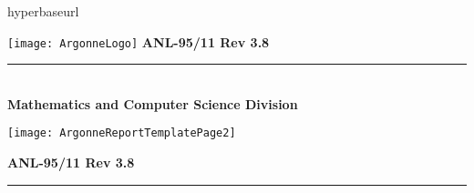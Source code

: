 %
%

hyperbaseurl

\makeindex

\def\design{\medskip \noindent Design Issue:\begin{em}}
\def\enddesign{\end{em} \medskip}


\def\shortintro{false}

\usepackage{fancyhdr,lastpage}
\pagestyle{fancy}





\pagestyle{empty}
\hspace{-.65in}\texttt{[image: ArgonneLogo]}
\hfill  {\large {\bf ANL-95/11 Rev 3.8}}

\vspace*{2in}
\vspace*{8pt}
\hrule
\vspace*{8pt}

\vspace*{1in}
\noindent \\
{\Large {\bf Mathematics and Computer Science Division}}

\vspace*{10pt}


\vspace*{20pt}



\newpage
\centerline{\texttt{[image: ArgonneReportTemplatePage2]}}
\newpage

\hfill {\large {\bf ANL-95/11 Rev 3.8}}

\vspace*{2in}
\vspace*{8pt}
\hrule
\vspace*{8pt}

